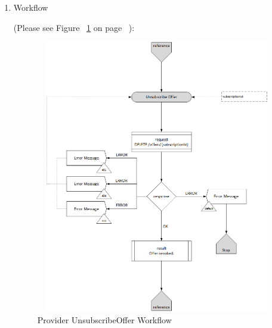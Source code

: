 \begin{enumerate}




\item Workflow

(Please see Figure ~\ref{fig:UsO} on page ~\pageref{fig:UsO}):

\begin{figure}[H]
    \centering
    \includegraphics[width=12cm,height=12cm,angle=0]{./diag/Workflow/Market/UnsubscribeOffer-P-Workflow.png}
    \caption{Provider UnsubscribeOffer Workflow}
	\label{fig:UsO}
\end{figure}

\end{enumerate}

\newpage



